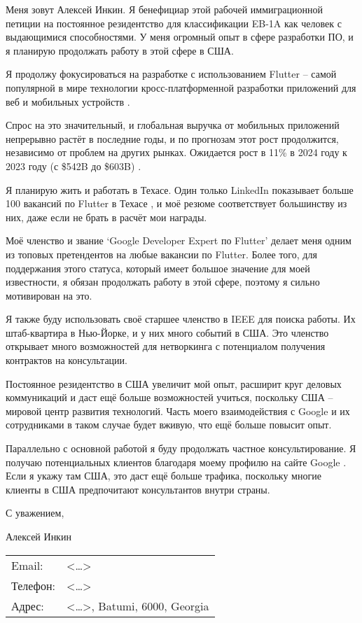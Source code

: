 \label{WorkPlan}

Меня зовут Алексей Инкин.
Я бенефициар этой рабочей иммиграционной петиции на постоянное резидентство
для классификации EB-1A как человек с выдающимися способностями.
У меня огромный опыт в сфере разработки ПО,
и я планирую продолжать работу в этой сфере в США.

Я продолжу фокусироваться на разработке с использованием Flutter
-- самой популярной в мире технологии кросс-платформенной разработки приложений
для веб и мобильных устройств .

Спрос на это значительный, и глобальная выручка от мобильных приложений
непрерывно растёт в последние годы, и по прогнозам этот рост продолжится,
независимо от проблем на других рынках.
Ожидается рост в 11\% в 2024 году к 2023 году (с \$542B до \$603B) .

Я планирую жить и работать в Техасе.
Один только LinkedIn показывает больше 100 вакансий по Flutter в Техасе ,
и моё резюме соответствует большинству из них, даже если не брать в расчёт мои награды.

Моё членство и звание `Google Developer Expert по Flutter'
делает меня одним из топовых претендентов на любые вакансии по Flutter.
Более того, для поддержания этого статуса, который имеет большое значение для моей известности,
я обязан продолжать работу в этой сфере, поэтому я сильно мотивирован на это.

Я также буду использовать своё старшее членство в IEEE для поиска работы.
Их штаб-квартира в Нью-Йорке, и у них много событий в США.
Это членство открывает много возможностей для нетворкинга
с потенциалом получения контрактов на консультации.

Постоянное резидентство в США увеличит мой опыт, расширит круг деловых коммуникаций
и даст ещё больше возможностей учиться, поскольку США -- мировой центр
развития технологий.
Часть моего взаимодействия с Google и их сотрудниками в таком случае будет вживую,
что ещё больше повысит опыт.

Параллельно с основной работой я буду продолжать частное консультирование.
Я получаю потенциальных клиентов благодаря моему профилю на сайте Google .
Если я укажу там США, это даст ещё больше трафика,
поскольку многие клиенты в США предпочитают консультантов внутри страны.

С уважением,

Алексей Инкин

\begin{tabular}{ll}
    Email: & <\dots>\\
    Телефон: & <\dots>\\
    Адрес: & <\dots>, Batumi, 6000, Georgia\\
\end{tabular}

\pagebreak
